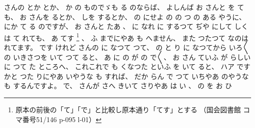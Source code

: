 さんの
とか
とか、
%
か
の
ものでゞも
る
のならば、
%
よしんば
お
さんと
を
ても、
%
お
さんを
るとか、
%
しを
するとか、
%
の
にせよ
の
%
の
つ
の
ある
やうに、
%
にか
て
る
のですが、
%
お
さんと
たあ
、
%
に
なれ
に
するつて
ぢや
にして
しくは
て
れても、
%
あ
てす
\footnote{原本の前後の「て」「で」と比較し原本通り「てす」とする
（国会図書館 コマ番号51/146 p-095 l-01）}%
、
%
ふ
までにやあ
も
へません、
%
また
つたつて
なのは
れてます。
%
です
けれど
さんの
に
なつて
つて、
%
の
と
り
に
なつてから
いろ〳〵の
いきさつを
いて
つて
ると、
%
あ
に
の
が
の
で〳〵、
%
お
さん
ていふ
が
%
らしい
に
つて
た
ところへ、
%
これこれで%
も
くなつた
といふ
を
いて
ると、
ハア
ですかと
つた
りにやあ
いやうな
も
すれば、
%
だか
らん
で
つて
いちやあ
のやうな
も
するんですよ。
%
で、
%
さんが
さへ
きいて
さりやあ
は
い
、
%
の
を
お
ひ
